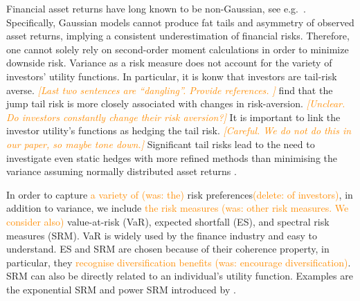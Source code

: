 \documentclass[11pt,a4paper,english]{article}
\providecommand{\natp}[1]{\textcolor{darkorange}{#1}}
\begin{document}
Financial asset returns have long known to be non-Gaussian, see e.g.\
\citep{fama1963mandelbrot,Cont2001}. Specifically, Gaussian models
cannot produce fat tails and asymmetry of observed
asset returns, implying a consistent underestimation of financial
risks. 
Therefore, one cannot solely rely on second-order moment calculations
in order to minimize downside risk. Variance as a risk measure does not
account for the variety of investors' utility functions. In
particular, it is konw that  
investors are tail-risk averse. \natp{\em [Last two sentences are
  ``dangling''. Provide references. ]}
\citet{bollerslev2015tail} find that the jump tail risk is more
closely associated with changes in risk-aversion. \natp{\em
  [Unclear. Do investors constantly change their risk aversion?]}
It is important to link the investor utility's functions as hedging
the tail risk. \natp{\em [Careful. We do not do this in our paper, so
  maybe tone down.]}
Significant tail risks lead to the need to investigate even static
hedges with more refined methods than minimising the variance assuming
normally distributed asset returns
\citep{ederington2008minimum}. \medskip 

In order to capture \natp{a variety of (was: the)} risk
preferences\natp{(delete: of investors)}, in addition to variance, we
include \natp{the risk measures (was: other risk measures. 
We consider also)} value-at-risk (VaR), expected shortfall (ES), and
spectral risk measures (SRM). 
VaR is widely used by the finance industry and easy to understand. 
ES and SRM are chosen because of their coherence property, in
particular, they \natp{recognise diversification benefits (was: encourage diversification)}.
SRM can also be directly related to an individual's utility function.
Examples are the exponential SRM and power SRM introduced by
\citet{dowd2008spectral}.\medskip
\end{document}
